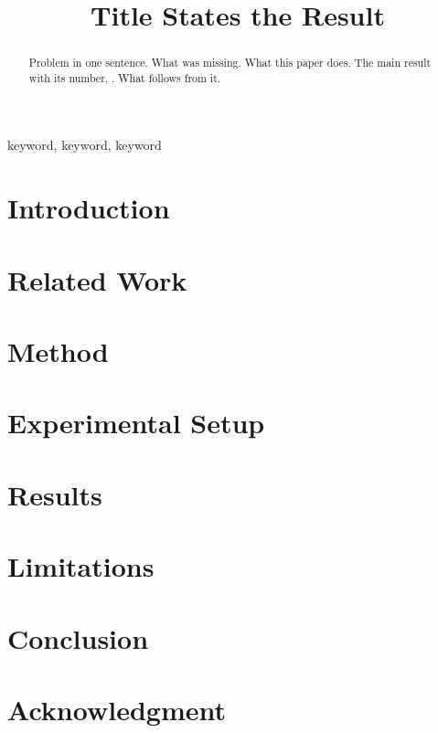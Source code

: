 \documentclass[conference]{IEEEtran}
\newif\ifanycitation
\begin{document}
\title{Title States the Result}

\author{
}

\maketitle

\begin{abstract}
Problem in one sentence. What was missing. What this paper does. The main result with its number, \headline{}. What follows from it.
\end{abstract}

\begin{IEEEkeywords}
keyword, keyword, keyword
\end{IEEEkeywords}

\section{Introduction}

\section{Related Work}

\section{Method}

\section{Experimental Setup}

\section{Results}

\section{Limitations}

\section{Conclusion}

\section*{Acknowledgment}

\ifanycitation


\fi
\end{document}
